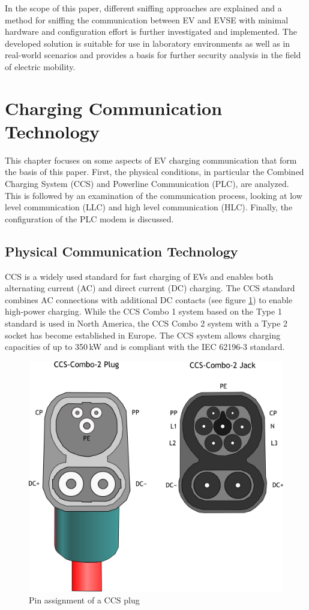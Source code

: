\documentclass[sigconf]{acmart}
\begin{document}
In the scope of this paper, different sniffing approaches are explained and a method for sniffing the communication between EV and EVSE with minimal hardware and configuration effort is further investigated and implemented. The developed solution is suitable for use in laboratory environments as well as in real-world scenarios and provides a basis for further security analysis in the field of electric mobility.

\section{Charging Communication Technology}
This chapter focuses on some aspects of EV charging communication that form the basis of this paper. First, the physical conditions, in particular the Combined Charging System (CCS) and Powerline Communication (PLC), are analyzed. This is followed by an examination of the communication process, looking at low level communication (LLC) and high level communication (HLC). Finally, the configuration of the PLC modem is discussed.

\subsection{Physical Communication Technology}
CCS is a widely used standard for fast charging of EVs and enables both alternating current (AC) and direct current (DC) charging. The CCS standard combines AC connections with additional DC contacts (see figure \ref{fig:CCS-pinout}) to enable high-power charging. While the CCS Combo 1 system based on the Type 1 standard is used in North America, the CCS Combo 2 system with a Type 2 socket has become established in Europe. The CCS system allows charging capacities of up to 350\,kW and is compliant with the IEC 62196-3 standard. \citep[p.\,7]{acharige-review-2023}

\begin{figure}[ht]
    \centering
    \includegraphics[width=0.7\linewidth]{graphics/CCS-Combo-2.png}
    \caption{Pin assignment of a CCS plug \citep{Ajzh2074-CCS-Plug}}
    \label{fig:CCS-pinout}
\end{figure}
\end{document}
